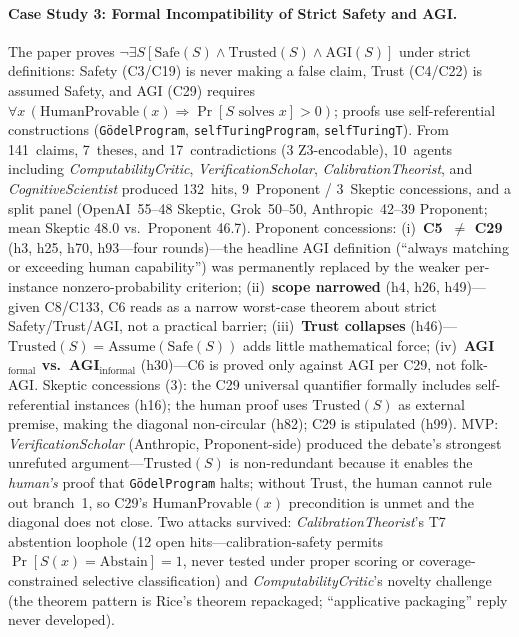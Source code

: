 \documentclass[11pt]{article}
\begin{document}
\paragraph{Case Study 3: Formal Incompatibility of Strict Safety and AGI.}
\label{sec:case_agi}
The paper proves $\neg\exists S[\mathrm{Safe}(S) \wedge \mathrm{Trusted}(S) \wedge \mathrm{AGI}(S)]$ under strict definitions: Safety (C3/C19) is never making a false claim, Trust (C4/C22) is assumed Safety, and AGI (C29) requires $\forall x\,(\mathrm{HumanProvable}(x) \Rightarrow \Pr[S\text{ solves }x] > 0)$; proofs use self-referential constructions (\texttt{GödelProgram}, \texttt{selfTuringProgram}, \texttt{selfTuringT}). From 141~claims, 7~theses, and 17~contradictions (3 Z3-encodable), 10~agents including \emph{ComputabilityCritic}, \emph{VerificationScholar}, \emph{CalibrationTheorist}, and \emph{CognitiveScientist} produced 132~hits, 9~Proponent / 3~Skeptic concessions, and a split panel (OpenAI~55--48 Skeptic, Grok~50--50, Anthropic~42--39 Proponent; mean Skeptic 48.0 vs.\ Proponent 46.7). Proponent concessions: (i)~\textbf{C5~$\neq$ C29} (h3, h25, h70, h93---four rounds)---the headline AGI definition (``always matching or exceeding human capability'') was permanently replaced by the weaker per-instance nonzero-probability criterion; (ii)~\textbf{scope narrowed} (h4, h26, h49)---given C8/C133, C6 reads as a narrow worst-case theorem about strict Safety/Trust/AGI, not a practical barrier; (iii)~\textbf{Trust collapses} (h46)---$\mathrm{Trusted}(S) = \mathrm{Assume}(\mathrm{Safe}(S))$ adds little mathematical force; (iv)~\textbf{AGI$_{\mathrm{formal}}$ vs.\ AGI$_{\mathrm{informal}}$} (h30)---C6 is proved only against AGI per C29, not folk-AGI. Skeptic concessions (3): the C29 universal quantifier formally includes self-referential instances (h16); the human proof uses $\mathrm{Trusted}(S)$ as external premise, making the diagonal non-circular (h82); C29 is stipulated (h99). MVP: \emph{VerificationScholar} (Anthropic, Proponent-side) produced the debate's strongest unrefuted argument---$\mathrm{Trusted}(S)$ is non-redundant because it enables the \emph{human's} proof that \texttt{GödelProgram} halts; without Trust, the human cannot rule out branch~1, so C29's $\mathrm{HumanProvable}(x)$ precondition is unmet and the diagonal does not close. Two attacks survived: \emph{CalibrationTheorist}'s T7 abstention loophole (12 open hits---calibration-safety permits $\Pr[S(x){=}\mathrm{Abstain}]{=}1$, never tested under proper scoring or coverage-constrained selective classification) and \emph{ComputabilityCritic}'s novelty challenge (the theorem pattern is Rice's theorem repackaged; ``applicative packaging'' reply never developed).
\end{document}
